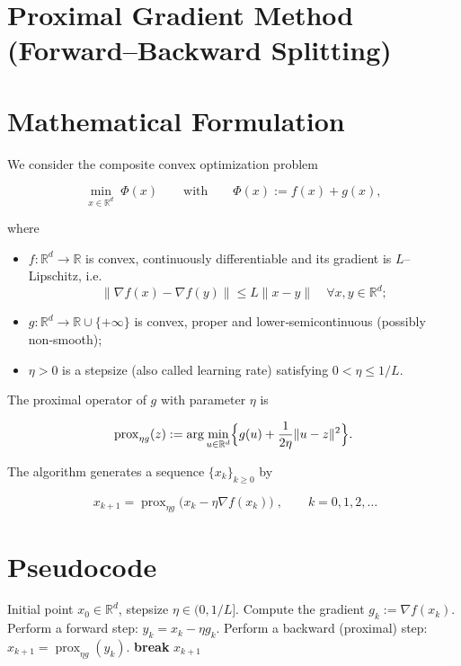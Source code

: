 \documentclass{article}
\newcommand{\prox}{\operatorname{prox}}
\newcommand{\R}{\mathbb{R}}
\begin{document}
\section*{Proximal Gradient Method (Forward–Backward Splitting)}

\section*{Mathematical Formulation}
We consider the composite convex optimization problem  

\[
\min_{x\in\R^{d}}\; \Phi(x)\qquad\text{with}\qquad 
\Phi(x):=f(x)+g(x),
\]

where  

\begin{itemize}[nosep]
\item $f:\R^{d}\to\R$ is convex, continuously differentiable and its gradient is $L$–Lipschitz, i.e.  
\[
\|\nabla f(x)-\nabla f(y)\|\le L\|x-y\|\quad\forall x,y\in\R^{d};
\]
\item $g:\R^{d}\to\R\cup\{+\infty\}$ is convex, proper and lower‑semicontinuous (possibly non‑smooth);
\item $\eta>0$ is a stepsize (also called learning rate) satisfying $0<\eta\le 1/L$.
\end{itemize}

The proximal operator of $g$ with parameter $\eta$ is  

\[
\prox_{\eta g}(z):=\arg\min_{u\in\R^{d}}\Bigl\{ g(u)+\frac{1}{2\eta}\|u-z\|^{2}\Bigr\}.
\]

The algorithm generates a sequence $\{x_{k}\}_{k\ge0}$ by  

\[
\boxed{\;x_{k+1}= \prox_{\eta g}\bigl(x_{k}-\eta\nabla f(x_{k})\bigr)\;},\qquad k=0,1,2,\dots
\tag{1}
\]

\section*{Pseudocode}
\begin{algorithm}[H]
\caption{Proximal Gradient Method}
\begin{algorithmic}[1]
\REQUIRE Initial point $x_{0}\in\R^{d}$, stepsize $\eta\in(0,1/L]$.
    \STATE Compute the gradient $g_{k}:=\nabla f(x_{k})$.
    \STATE Perform a forward step: $y_{k}=x_{k}-\eta g_{k}$.
    \STATE Perform a backward (proximal) step: $x_{k+1}= \prox_{\eta g}(y_{k})$.
        \STATE \textbf{break}
    \ENDIF
\ENDFOR
\RETURN $x_{k+1}$
\end{algorithmic}
\end{algorithm}
\end{document}
